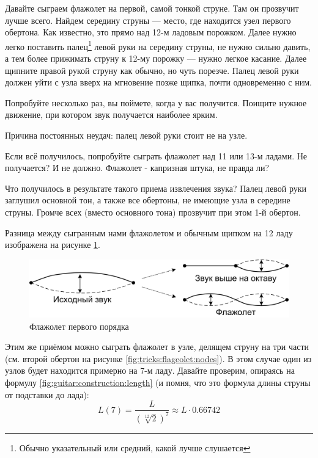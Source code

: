 \begin{Example}
    Давайте сыграем флажолет на первой, самой тонкой струне. Там он прозвучит лучше всего. Найдем середину струны --- место, где находится узел первого обертона. Как известно, это прямо над 12-м ладовым порожком. Далее нужно легко поставить палец\footnote{Обычно указательный или средний, какой лучше слушается} левой руки на середину струны, не нужно сильно давить, а тем более прижимать струну к 12-му порожку --- нужно легкое касание. Далее щипните правой рукой струну как обычно, но чуть порезче. Палец левой руки должен уйти с узла вверх на мгновение позже щипка, почти одновременно с ним.
    
    Попробуйте несколько раз, вы поймете, когда у вас получится. Поищите нужное движение, при котором звук получается наиболее ярким.
    
    Причина постоянных неудач: палец левой руки стоит не на узле. 
    
    Если всё получилось, попробуйте сыграть флажолет над 11 или 13-м ладами. Не получается? И не должно. Флажолет - капризная штука, не правда ли?
    
    Что получилось в результате такого приема извлечения звука? Палец левой руки заглушил основной тон, а также все обертоны, не имеющие узла в середине струны. Громче всех (вместо основного тона) прозвучит при этом 1-й обертон.
    
    Разница между сыгранным нами флажолетом и обычным щипком на 12 ладу изображена на рисунке \ref{fig:tricks:flageolet:first}.
\end{Example}
 
\begin{figure}[!ht]
    \centering
    \includegraphics{fig/string-flageolet} 
    \caption{Флажолет первого порядка}\label{fig:tricks:flageolet:first}
\end{figure} 

Этим же приёмом можно сыграть флажолет в узле, делящем струну на три части (см. второй обертон на рисунке \ref{fig:tricks:flageolet:nodes}). В этом случае один из узлов будет находится примерно на 7-м ладу. Давайте проверим, опираясь на формулу \ref{fig:guitar:construction:length} (и помня, что это формула длины струны от подставки до лада):
\[
    L(7)=\frac{L}{(\sqrt[12]{2})^7}\approx L\cdot 0.66742
\]

